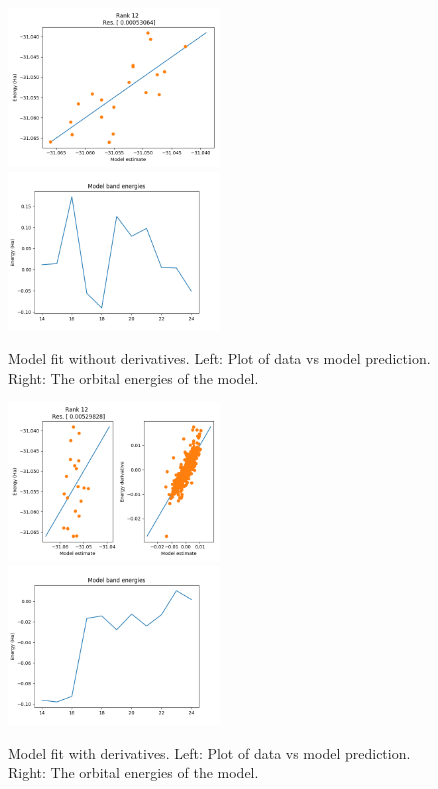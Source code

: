 \begin{figure}[h!]
\includegraphics[width=0.5\textwidth]{images/vmc_lowen_model.png}
\includegraphics[width=0.5\textwidth]{images/vmc_lowen_model_bands.png}
\label{fig:model_fit_noderivs}
\caption{Model fit without derivatives. Left: Plot of data vs model prediction. Right: The orbital energies of the model.}
\end{figure}

\begin{figure}[h!]
\includegraphics[width=0.5\textwidth]{images/vmc_allderivs_lowen_model.png}
\includegraphics[width=0.5\textwidth]{images/vmc_allderivs_lowen_model_bands.png}
\label{fig:model_fit}
\caption{Model fit with derivatives. Left: Plot of data vs model prediction. Right: The orbital energies of the model.}
\end{figure}

  
  





